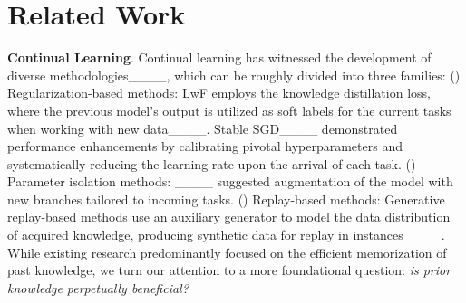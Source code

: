 \section{Related Work}
\vspace{-.2cm}
\textbf{Continual Learning}. 
Continual learning has witnessed the development of diverse methodologies____, which can be roughly divided into three families:
() Regularization-based methods: LwF employs the knowledge distillation loss, where the previous model's output is utilized as soft labels for the current tasks when working with new data____.
Stable SGD____ demonstrated performance enhancements by calibrating pivotal hyperparameters and systematically reducing the learning rate upon the arrival of each task.
() Parameter isolation methods: ____ suggested augmentation of the model with new branches tailored to incoming tasks.
() Replay-based methods: 
Generative replay-based methods use an auxiliary generator to model the data distribution of acquired knowledge, producing synthetic data for replay in instances____.
While existing research predominantly focused on the efficient memorization of past knowledge, we turn our attention to a more foundational question: \emph{is prior knowledge perpetually beneficial?}

